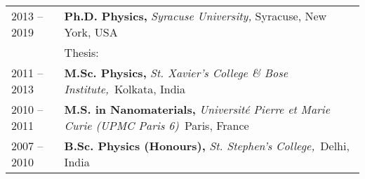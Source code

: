 


\begin{longtable}{R{2.5cm}|p{14.8cm}}
 	\textsc{2013 -- 2019} &\textbf{Ph.D. Physics, } \emph{Syracuse University,} Syracuse, New York, USA\\ 
& Thesis:  \\ %
	\textsc{2011 -- 2013} & \textbf{M.Sc. Physics, }\emph{St. Xavier's College \& Bose Institute,}{~Kolkata, }{India} \\
\textsc{2010 -- 2011} &\textbf{M.S. in Nanomaterials, }\emph{Universit\'{e} Pierre et Marie Curie (UPMC Paris 6)}{~Paris, }{France} \\
\textsc{2007 -- 2010} & \textbf{B.Sc. Physics (Honours),} \emph{St. Stephen's College,}{~Delhi, }{India} \\	
\end{longtable}
